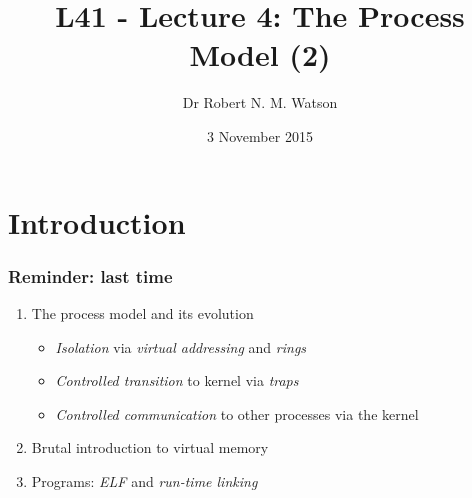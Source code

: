 %
%
%

{
}

\usepackage[english]{babel}
\usepackage[latin1]{inputenc}
\usepackage{graphicx}
\usepackage{times}
\usepackage[T1]{fontenc}
\usepackage{fancyvrb}
\usepackage{listings}
\usepackage{multirow}
\usepackage{ulem}


\title{L41 - Lecture 4: The Process Model (2)}
\author{Dr Robert N. M. Watson}
\date{3 November 2015}

\begin{frame}
  \titlepage
\end{frame}

\section{Introduction}

\begin{frame}
  \frametitle{Reminder: last time}

  \begin{enumerate}
    \item The process model and its evolution
    \begin{itemize}
      \item \textit{Isolation} via \textit{virtual addressing} and
	\textit{rings}
      \item \textit{Controlled transition} to kernel via \textit{traps}
      \item \textit{Controlled communication} to other processes via the kernel
    \end{itemize}
    \item Brutal introduction to virtual memory
    \item Programs: \textit{ELF} and \textit{run-time linking}
  \end{enumerate}
\end{frame}

